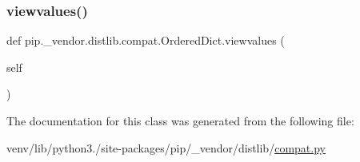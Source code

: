 \mbox{\label{classpip_1_1__vendor_1_1distlib_1_1compat_1_1OrderedDict_a3ef3ae6f092c0239fb19b4eca4a2175a}} 
\subsubsection{\texorpdfstring{viewvalues()}{viewvalues()}}
{\footnotesize\ttfamily def pip.\+\_\+vendor.\+distlib.\+compat.\+Ordered\+Dict.\+viewvalues (\begin{DoxyParamCaption}\item[{}]{self }\end{DoxyParamCaption})}



The documentation for this class was generated from the following file\+:\begin{DoxyCompactItemize}
\item 
venv/lib/python3./site-\/packages/pip/\+\_\+vendor/distlib/\hyperlink{__vendor_2distlib_2compat_8py}{compat.\+py}\end{DoxyCompactItemize}
